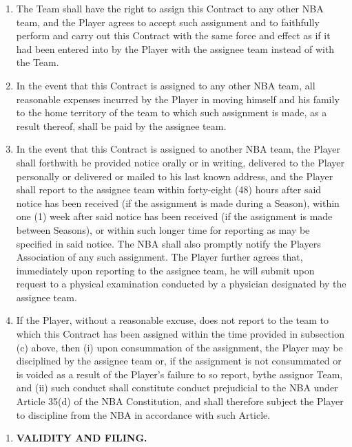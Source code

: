 \documentclass[
]{book}
\providecommand{\tightlist}{%
  \setlength{\itemsep}{0pt}\setlength{\parskip}{0pt}}
\begin{document}
\begin{enumerate}
\def\labelenumi{(\alph{enumi})}
\tightlist
\item
  The Team shall have the right to assign this Contract to any other NBA team, and the Player agrees to accept such assignment and to faithfully perform and carry out this Contract with the same force and effect as if it had been entered into by the Player with the assignee team instead of with the Team.
\item
  In the event that this Contract is assigned to any other NBA team, all reasonable expenses incurred by the Player in moving himself and his family to the home territory of the team to which such assignment is made, as a result thereof, shall be paid by the assignee team.
\item
  In the event that this Contract is assigned to another NBA team, the Player shall forthwith be provided notice orally or in writing, delivered to the Player personally or delivered or mailed to his last known address, and the Player shall report to the assignee team within forty-eight (48) hours after said notice has been received (if the assignment is made during a Season), within one (1) week after said notice has been received (if the assignment is made between Seasons), or within such longer time for reporting as may be specified in said notice. The NBA shall also promptly notify the Players Association of any such assignment. The Player further agrees that, immediately upon reporting to the assignee team, he will submit upon request to a physical examination conducted by a physician designated by the assignee team.
\item
  If the Player, without a reasonable excuse, does not report to the team to which this Contract has been assigned within the time provided in subsection (c) above, then (i) upon consummation of the assignment, the Player may be disciplined by the assignee team or, if the assignment is not consummated or is voided as a result of the Player's failure to so report, bythe assignor Team, and (ii) such conduct shall constitute conduct prejudicial to the NBA under Article 35(d) of the NBA Constitution, and shall therefore subject the Player to discipline from the NBA in accordance with such Article.
\end{enumerate}

\begin{enumerate}
\def\labelenumi{\arabic{enumi}.}
\setcounter{enumi}{10}
\tightlist
\item
  \textbf{VALIDITY AND FILING.}
\end{enumerate}
\end{document}
